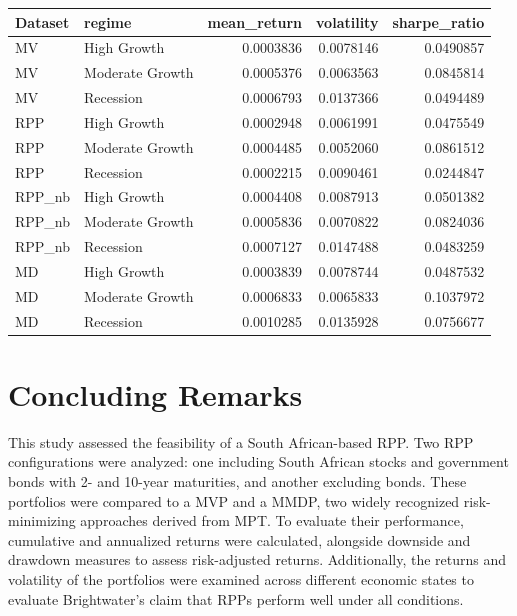 \documentclass[11pt,preprint]{elsarticle}
\let\origtable\table
\let\endorigtable\endtable
\renewenvironment{table}[1][2] {
    \expandafter\origtable\expandafter[H]
} {
    \endorigtable
}
\numberwithin{equation}{section}
\numberwithin{figure}{section}
\numberwithin{table}{section}
\begin{document}
\begin{table}
\centering
\caption{\label{tab:regime}Performance at Different Economic States}
\centering
\begin{tabular}[t]{l|l|r|r|r}
\hline
Dataset & regime & mean\_return & volatility & sharpe\_ratio\\
\hline
MV & High Growth & 0.0003836 & 0.0078146 & 0.0490857\\
\hline
MV & Moderate Growth & 0.0005376 & 0.0063563 & 0.0845814\\
\hline
MV & Recession & 0.0006793 & 0.0137366 & 0.0494489\\
\hline
RPP & High Growth & 0.0002948 & 0.0061991 & 0.0475549\\
\hline
RPP & Moderate Growth & 0.0004485 & 0.0052060 & 0.0861512\\
\hline
RPP & Recession & 0.0002215 & 0.0090461 & 0.0244847\\
\hline
RPP\_nb & High Growth & 0.0004408 & 0.0087913 & 0.0501382\\
\hline
RPP\_nb & Moderate Growth & 0.0005836 & 0.0070822 & 0.0824036\\
\hline
RPP\_nb & Recession & 0.0007127 & 0.0147488 & 0.0483259\\
\hline
MD & High Growth & 0.0003839 & 0.0078744 & 0.0487532\\
\hline
MD & Moderate Growth & 0.0006833 & 0.0065833 & 0.1037972\\
\hline
MD & Recession & 0.0010285 & 0.0135928 & 0.0756677\\
\hline
\end{tabular}
\end{table}

\section{Concluding Remarks}\label{concluding-remarks}

This study assessed the feasibility of a South African-based RPP. Two
RPP configurations were analyzed: one including South African stocks and
government bonds with 2- and 10-year maturities, and another excluding
bonds. These portfolios were compared to a MVP and a MMDP, two widely
recognized risk-minimizing approaches derived from MPT. To evaluate
their performance, cumulative and annualized returns were calculated,
alongside downside and drawdown measures to assess risk-adjusted
returns. Additionally, the returns and volatility of the portfolios were
examined across different economic states to evaluate Brightwater's
claim that RPPs perform well under all conditions.
\end{document}
